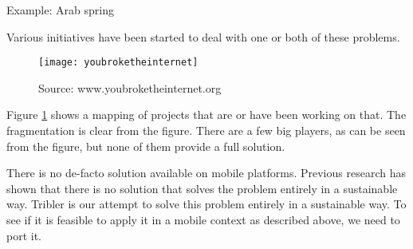 Example: Arab spring \cite{Johan_2001}


Various initiatives have been started to deal with one or both of these problems. \cite{re_decentralize}

\begin{figure}
	\centering
	\texttt{[image: youbroketheinternet]}
	\caption{Source: www.youbroketheinternet.org}
	\label{fig:youbroketheinternet}
\end{figure}

Figure \ref{fig:youbroketheinternet} shows a mapping of projects that are or have been working on that.
The fragmentation is clear from the figure.
There are a few big players, as can be seen from the figure, but none of them provide a full solution.






There is no de-facto solution available on mobile platforms. \cite{literature_survey}
Previous research has shown that there is no solution that solves the problem entirely in a sustainable way.
Tribler is our attempt to solve this problem entirely in a sustainable way.
To see if it is feasible to apply it in a mobile context as described above, we need to port it.


